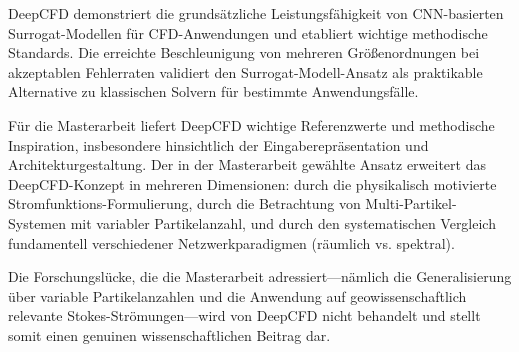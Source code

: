 \documentclass[a4paper,12pt]{article}
\begin{document}
DeepCFD demonstriert die grundsätzliche Leistungsfähigkeit von CNN-basierten Surrogat-Modellen für CFD-Anwendungen und etabliert wichtige methodische Standards. Die erreichte Beschleunigung von mehreren Größenordnungen bei akzeptablen Fehlerraten validiert den Surrogat-Modell-Ansatz als praktikable Alternative zu klassischen Solvern für bestimmte Anwendungsfälle.

Für die Masterarbeit liefert DeepCFD wichtige Referenzwerte und methodische Inspiration, insbesondere hinsichtlich der Eingaberepräsentation und Architekturgestaltung. Der in der Masterarbeit gewählte Ansatz erweitert das DeepCFD-Konzept in mehreren Dimensionen: durch die physikalisch motivierte Stromfunktions-Formulierung, durch die Betrachtung von Multi-Partikel-Systemen mit variabler Partikelanzahl, und durch den systematischen Vergleich fundamentell verschiedener Netzwerkparadigmen (räumlich vs. spektral).

Die Forschungslücke, die die Masterarbeit adressiert---nämlich die Generalisierung über variable Partikelanzahlen und die Anwendung auf geowissenschaftlich relevante Stokes-Strömungen---wird von DeepCFD nicht behandelt und stellt somit einen genuinen wissenschaftlichen Beitrag dar.
\end{document}
